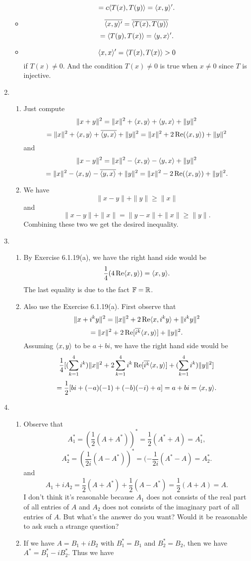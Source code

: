 \begin{enumerate}
\begin{itemize}
\[=c\langle T(x),T(y)\rangle =\langle x,y\rangle'.\]
\item \[\overline{\langle x,y\rangle'}=\overline{\langle T(x),T(y)\rangle}\]
\[=\langle T(y),T(x)\rangle =\langle y,x\rangle'.\]
\item \[\langle x,x\rangle'=\langle T(x),T(x)\rangle>0\]
if $T(x)\neq 0$. And the condition $T(x)\neq 0$ is true when $x\neq 0$ since $T$ is injective.
\end{itemize}
\item \begin{enumerate}
\item Just compute 
\[\|x+y\|^2=\|x\|^2+\langle x,y\rangle +\langle y,x\rangle +\|y\|^2\]
\[=\|x\|^2+\langle x,y\rangle +\overline{\langle y,x\rangle }+\|y\|^2=\|x\|^2+2\operatorname{Re}(\langle x,y\rangle )+\|y\|^2\]
and 
\[\|x-y\|^2=\|x\|^2-\langle x,y\rangle -\langle y,x\rangle +\|y\|^2\]
\[=\|x\|^2-\langle x,y\rangle -\overline{\langle y,x\rangle }+\|y\|^2=\|x\|^2-2\operatorname{Re}(\langle x,y\rangle )+\|y\|^2.\]
\item We have 
\[\|x-y\|+\|y\|\geq \|x\|\]
and 
\[\|x-y\|+\|x\|=\|y-x\|+\|x\|\geq \|y\|.\]
Combining these two we get the desired inequality.
\end{enumerate}
\item \begin{enumerate}
\item By Exercise 6.1.19(a), we have the right hand side would be 
\[\frac{1}{4}(4\operatorname{Re}\langle x,y\rangle)=\langle x,y\rangle.\]
The last equality is due to the fact $\mathbb{F}=\mathbb{R}$.
\item Also use the Exercise 6.1.19(a). First observe that 
\[\|x+i^ky\|^2=\|x\|^2+2\operatorname{Re}\langle x,i^ky\rangle +\|i^ky\|^2\]
\[=\|x\|^2+2\operatorname{Re}[\overline{i^k}\langle x,y\rangle ]+\|y\|^2.\]
Assuming $\langle x,y\rangle$ to be $a+bi$, we have the right hand side would be
\[\frac{1}{4}[(\sum_{k=1}^4{i^k})\|x\|^2+2\sum_{k=1}^4{i^k\operatorname{Re}[\overline{i^k}\langle x,y\rangle ]}+(\sum_{k=1}^4{i^k})\|y\|^2]\]
\[=\frac{1}{2}[bi+(-a)(-1)+(-b)(-i)+a]=a+bi=\langle x,y\rangle.\]
\end{enumerate}
\item \begin{enumerate}
\item Observe that 
\[A_1^*=(\frac{1}{2}(A+A^*))^*=\frac{1}{2}(A^*+A)=A_1^*,\]
\[A_2^*=(\frac{1}{2i}(A-A^*))^*=(-\frac{1}{2i}(A^*-A)=A_2^*.\]
and 
\[A_1+iA_2=\frac{1}{2}(A+A^*)+\frac{1}{2}(A-A^*)=\frac{1}{2}(A+A)=A.\]
I don't think it's reasonable because $A_1$ does not consists of the real part of all entries of $A$ and $A_2$ does not consists of the imaginary part of all entries of $A$. But what's the answer do you want? Would it be reasonable to ask such a strange question?
\item If we have $A=B_1+iB_2$ with $B_1^*=B_1$ and $B_2^*=B_2$, then we have $A^*=B_1^*-iB_2^*$. Thus we have 

\end{enumerate}
\end{enumerate}
